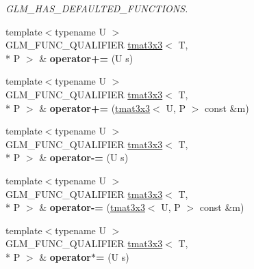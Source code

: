 \begin{DoxyCompactItemize}
\begin{DoxyCompactList}\small\item\em G\-L\-M\-\_\-\-H\-A\-S\-\_\-\-D\-E\-F\-A\-U\-L\-T\-E\-D\-\_\-\-F\-U\-N\-C\-T\-I\-O\-N\-S. \end{DoxyCompactList}\item 
\hypertarget{structglm_1_1tmat3x3_a217d0152118e3bb5f26da12641b5f48a}{{\footnotesize template$<$typename U $>$ }\\G\-L\-M\-\_\-\-F\-U\-N\-C\-\_\-\-Q\-U\-A\-L\-I\-F\-I\-E\-R \hyperlink{structglm_1_1tmat3x3}{tmat3x3}$<$ T, \\*
P $>$ \& {\bfseries operator+=} (U s)}\label{structglm_1_1tmat3x3_a217d0152118e3bb5f26da12641b5f48a}

\item 
\hypertarget{structglm_1_1tmat3x3_a767f25ce5e8dfe01f93427ab11f66b68}{{\footnotesize template$<$typename U $>$ }\\G\-L\-M\-\_\-\-F\-U\-N\-C\-\_\-\-Q\-U\-A\-L\-I\-F\-I\-E\-R \hyperlink{structglm_1_1tmat3x3}{tmat3x3}$<$ T, \\*
P $>$ \& {\bfseries operator+=} (\hyperlink{structglm_1_1tmat3x3}{tmat3x3}$<$ U, P $>$ const \&m)}\label{structglm_1_1tmat3x3_a767f25ce5e8dfe01f93427ab11f66b68}

\item 
\hypertarget{structglm_1_1tmat3x3_a166d5db3f6cf38eacecbe33437776c7a}{{\footnotesize template$<$typename U $>$ }\\G\-L\-M\-\_\-\-F\-U\-N\-C\-\_\-\-Q\-U\-A\-L\-I\-F\-I\-E\-R \hyperlink{structglm_1_1tmat3x3}{tmat3x3}$<$ T, \\*
P $>$ \& {\bfseries operator-\/=} (U s)}\label{structglm_1_1tmat3x3_a166d5db3f6cf38eacecbe33437776c7a}

\item 
\hypertarget{structglm_1_1tmat3x3_ad9a2afce6d4b6fe5945d6b76e4f41163}{{\footnotesize template$<$typename U $>$ }\\G\-L\-M\-\_\-\-F\-U\-N\-C\-\_\-\-Q\-U\-A\-L\-I\-F\-I\-E\-R \hyperlink{structglm_1_1tmat3x3}{tmat3x3}$<$ T, \\*
P $>$ \& {\bfseries operator-\/=} (\hyperlink{structglm_1_1tmat3x3}{tmat3x3}$<$ U, P $>$ const \&m)}\label{structglm_1_1tmat3x3_ad9a2afce6d4b6fe5945d6b76e4f41163}

\item 
\hypertarget{structglm_1_1tmat3x3_ae74a84be216d7521d27a54d582a161c6}{{\footnotesize template$<$typename U $>$ }\\G\-L\-M\-\_\-\-F\-U\-N\-C\-\_\-\-Q\-U\-A\-L\-I\-F\-I\-E\-R \hyperlink{structglm_1_1tmat3x3}{tmat3x3}$<$ T, \\*
P $>$ \& {\bfseries operator$\ast$=} (U s)}\label{structglm_1_1tmat3x3_ae74a84be216d7521d27a54d582a161c6}


\end{DoxyCompactItemize}
